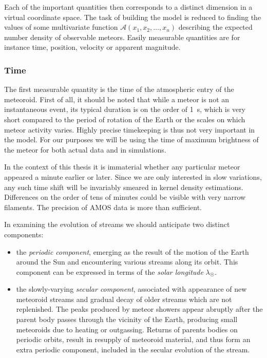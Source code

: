         Each of the important quantities then corresponds to a distinct dimension in a virtual coordinate space.
        The task of building the model is reduced to finding the values of some multivariate
        function $\mathcal{A}(x_1, x_2, \ldots, x_n)$ describing the expected number density of observable meteors.
        Easily measurable quantities are for instance time, position, velocity or apparent magnitude.

        \subsubsection{Time} \label{mspt}
            The first measurable quantity is the time of the atmospheric entry of the meteoroid.
            First of all, it should be noted that while a meteor is not an instantaneous event,
            its typical duration is on the order of \SI{1}{\second}, which is very short compared to the
            period of rotation of the Earth or the scales on which meteor activity varies.
            Highly precise timekeeping is thus not very important in the model.
            For our purposes we will be using the time of maximum brightness
            of the meteor for both actual data and in simulations.

            In the context of this thesis it is immaterial whether any particular meteor
            appeared a minute earlier or later. Since we are only interested in slow variations,
            any such time shift will be invariably smeared in kernel density estimations.
            Differences on the order of tens of minutes could be visible with very narrow filaments.
            The precision of AMOS data is more than sufficient.

            In examining the evolution of streams we should anticipate two distinct components:
            \begin{itemize}
                \item the \emph{periodic component}, emerging as the result of the motion of the Earth
                    around the Sun and encountering various streams along its orbit.
                    This component can be expressed in terms of the \emph{solar longitude} $\lambda_\Sun$.

                \item the slowly-varying \emph{secular component}, associated with appearance of new meteoroid
                    streams and gradual decay of older streams which are not replenished.
                    The peaks produced by meteor showers appear abruptly after the parent body
                    passes through the vicinity of the Earth, producing small meteoroids due to heating or outgassing.
                    Returns of parents bodies on periodic orbits, result in resupply of meteoroid material,
                    and thus form an extra periodic component, included in the secular evolution of the stream.
            \end{itemize}

